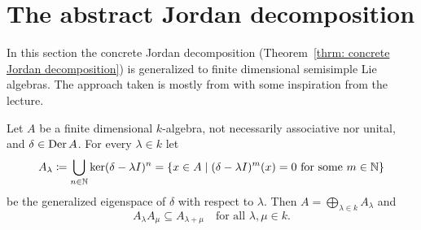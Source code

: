\section{The abstract Jordan decomposition}
In this section the concrete Jordan decomposition (Theorem~\ref{thrm: concrete Jordan decomposition}) is generalized to finite dimensional semisimple Lie algebras. The approach taken is mostly from \cite[\S 4.2, \S 5.3, \S 5.4, \S 6.4]{Humphreys} with some inspiration from the lecture.


\begin{lem}\label{lem: generalized eigenspace decomposition for derivations}
 Let $A$ be a finite dimensional $k$-algebra, not necessarily associative nor unital, and $\delta \in \operatorname{Der} A$. For every $\lambda \in k$ let
 \[
  A_\lambda
  \coloneqq \bigcup_{n \in \mathbb{N}} \ker(\delta-\lambda I)^n
  = \{x \in A \mid \text{$(\delta-\lambda I)^m(x) = 0$ for some $m \in \mathbb{N}$}\}
 \]
 be the generalized eigenspace of $\delta$ with respect to $\lambda$. Then $A = \bigoplus_{\lambda \in k} A_\lambda$ and
 \[
  A_\lambda A_\mu \subseteq A_{\lambda + \mu} \quad \text{for all $\lambda, \mu \in k$}.
 \]
\end{lem}
